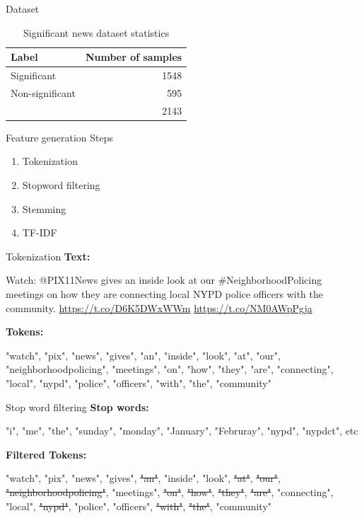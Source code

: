 \documentclass[12pt]{beamer}
\begin{document}
\begin{frame}{Dataset}
    \begin{table}[h]
    \begin{center}
    \begin{tabular}{lr}
    \toprule 
    Label&Number of samples\\
    \midrule 
    Significant&1548\\
    Non-significant&595\\
    \bottomrule
    &2143 \\
    \end{tabular}
    \caption{Significant news dataset statistics}
    \label{tbl:dataset_statistics}
    \end{center}
    \end{table}
\end{frame}

\begin{frame}{Feature generation}
    Steps
    \begin{enumerate}
        \item Tokenization
        \item Stopword filtering
        \item Stemming
        \item TF-IDF
    \end{enumerate}
\end{frame}

\begin{frame}{Tokenization}
    \textbf{Text:} \par
    Watch: @PIX11News  gives an inside look at our \#NeighborhoodPolicing
    meetings on how they are connecting local NYPD police officers with
    the community. \url{https://t.co/D6K5DWxWWm} \url{https://t.co/NM0AWpPgja}

    \textbf{Tokens:} \par
    "watch", "pix", "news", "gives", "an", "inside", "look", "at", "our", "neighborhoodpolicing", "meetings", "on", "how", "they", "are", "connecting", "local", "nypd", "police", "officers", "with", "the", "community"
\end{frame}

\begin{frame}{Stop word filtering}
    \textbf{Stop words:} \par
    "i", "me", "the", "sunday", "monday", "January", "Februray", "nypd", "nypdct", etc \par

    \textbf{Filtered Tokens:} \par
    "watch", "pix", "news", "gives", \sout{"an"}, "inside", "look", \sout{"at"}, \sout{"our"}, \sout{"neighborhoodpolicing"}, "meetings", \sout{"on"}, \sout{"how"}, \sout{"they"}, \sout{"are"}, "connecting", "local", \sout{"nypd"}, "police", "officers", \sout{"with"}, \sout{"the"}, "community"
\end{frame}
\end{document}
